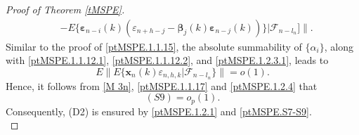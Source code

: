 \documentclass[ejsv2]{imsart}
\theoremstyle{plain}
\theoremstyle{definition}
\theoremstyle{remark}
\begin{document}
\begin{proof}[Proof of Theorem \ref{tMSPE}]
{\begin{equation}
\begin{split}
    &-E\{\bm{\varepsilon}_{n-i}(k)(\varepsilon_{n+h-j}-\bm{\beta}_j(k)\bm{\varepsilon}_{n-j}(k))\}|\mathcal{F}_{n-l_n}]\rVert.
\end{split}
\end{equation}
Similar to the proof of \eqref{ptMSPE.1.1.15}, the absolute summability of $\{\alpha_i\}$, along with \eqref{ptMSPE.1.1.12.1}, \eqref{ptMSPE.1.1.12.2}, and \eqref{ptMSPE.1.2.3.1}, leads to
\begin{equation}\label{ptMSPE.1.2.4}
E\lVert E\{\mathbf{x}_n(k)\varepsilon_{n,h,k}|\mathcal{F}_{n-l_n}\}\rVert=o(1).
\end{equation}
Hence, it follows from \eqref{M 3n}, \eqref{ptMSPE.1.1.17} and \eqref{ptMSPE.1.2.4} that
\begin{equation}\label{ptMSPE.1.2.5}
   (S9)=o_p(1).
\end{equation}
Consequently, (D2) is ensured by \eqref{ptMSPE.1.2.1} and \eqref{ptMSPE.S7-S9}.\\

}
\end{proof}
\end{document}
